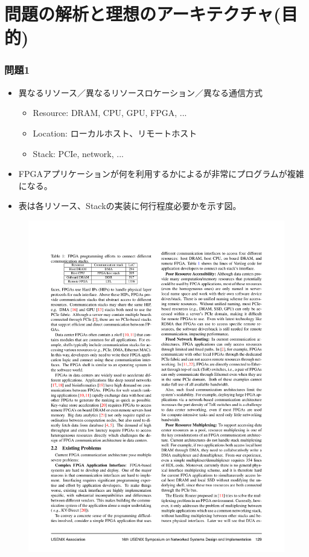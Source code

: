 \documentclass[dvipdfmx,9pt,notheorems]{beamer}
\theoremstyle{definition}
\begin{document}
\section{問題の解析と理想のアーキテクチャ(目的)}
\begin{frame}\frametitle{問題1}
	\begin{itemize}
		\item 異なるリソース／異なるリソースロケーション／異なる通信方式
			\begin{itemize}
				\item Resource: DRAM, CPU, GPU,  FPGA, ...
				\item Location: ローカルホスト、リモートホスト
				\item Stack: PCIe, network, ...
			\end{itemize}
		\item FPGAアプリケーションが何を利用するかによるが非常にプログラムが複雑になる。
		\item 表は各リソース、Stackの実装に何行程度必要かを示す図。
	\end{itemize}
  \begin{figure}[htb]
		\includegraphics[scale=1.0]{fig/table1.pdf}
  \end{figure}
	\pnote{
	}
\end{frame}
\end{document}
